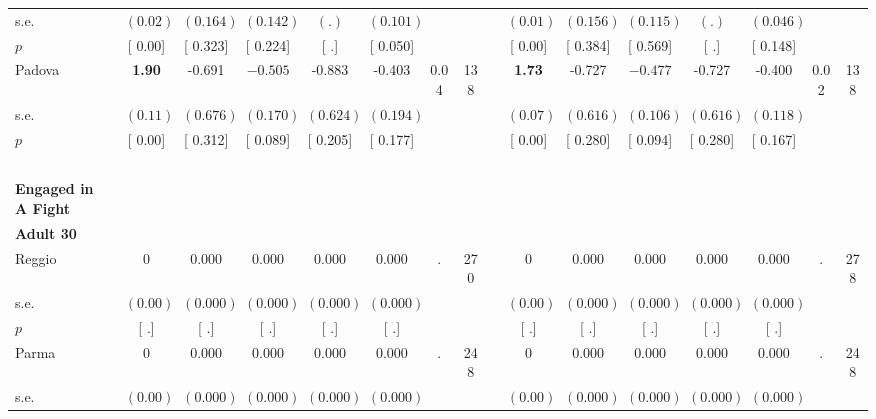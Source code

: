 \begin{longtable}{L{8em} c c c c c c c p{1em} c c c c c c c}
\quad \quad \quad \quad s.e.& $ (     0.02)$ & $ (    0.164)$ & $ (    0.142)$ & $ (        .)$ & $ (    0.101)$ & & & & $ (     0.01)$ & $ (    0.156)$ & $ (    0.115)$ & $ (        .)$ & $ (    0.046)$ & &  \\*
\quad \quad \quad \quad $ p$ & [     0.00] & [    0.323] & [    0.224] & [        .] & [    0.050] & & & & [     0.00] & [    0.384] & [    0.569] & [        .] & [    0.148] & &  \\[1em]
\quad \quad \quad Padova& \textbf{     1.90} &    -0.691 & $ \mathbf{   -0.505}$ &    -0.883 &    -0.403 &      0.04 &       138 & & \textbf{     1.73} &    -0.727 & $ \mathbf{   -0.477}$ &    -0.727 &    -0.400 &      0.02 &       138  \\*
\quad \quad \quad \quad s.e.& $ (     0.11)$ & $ (    0.676)$ & $ (    0.170)$ & $ (    0.624)$ & $ (    0.194)$ & & & & $ (     0.07)$ & $ (    0.616)$ & $ (    0.106)$ & $ (    0.616)$ & $ (    0.118)$ & &  \\*
\quad \quad \quad \quad $ p$ & [     0.00] & [    0.312] & [    0.089] & [    0.205] & [    0.177] & & & & [     0.00] & [    0.280] & [    0.094] & [    0.280] & [    0.167] & &  \\[1em]
~\\[1em]
\textbf{Engaged in A Fight} \\*
\quad \quad \textbf{Adult 30} & & & & & & & & & & & & & & & \\* 
\quad \quad \quad Reggio& 0 &     0.000 &     0.000 &     0.000 &     0.000 &         . &       270 & & 0 &     0.000 &     0.000 &     0.000 &     0.000 &         . &       278  \\*
\quad \quad \quad \quad s.e.& $ (     0.00)$ & $ (    0.000)$ & $ (    0.000)$ & $ (    0.000)$ & $ (    0.000)$ & & & & $ (     0.00)$ & $ (    0.000)$ & $ (    0.000)$ & $ (    0.000)$ & $ (    0.000)$ & &  \\*
\quad \quad \quad \quad $ p$ & [        .] & [        .] & [        .] & [        .] & [        .] & & & & [        .] & [        .] & [        .] & [        .] & [        .] & &  \\[1em]
\quad \quad \quad Parma& 0 &     0.000 &     0.000 &     0.000 &     0.000 &         . &       248 & & 0 &     0.000 &     0.000 &     0.000 &     0.000 &         . &       248  \\*
\quad \quad \quad \quad s.e.& $ (     0.00)$ & $ (    0.000)$ & $ (    0.000)$ & $ (    0.000)$ & $ (    0.000)$ & & & & $ (     0.00)$ & $ (    0.000)$ & $ (    0.000)$ & $ (    0.000)$ & $ (    0.000)$ & &  \\*

\end{longtable}
